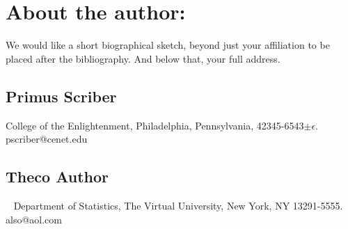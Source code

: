 \documentclass[a4paper]{article}
\begin{document}
\section*{About the author:}
   We would like a short biographical sketch,
   beyond just your affiliation to be placed
   after the bibliography.
   And below that, your full address.



\subsection*{Primus Scriber}
   College of the Enlightenment,
   Philadelphia, Pennsylvania, 42345-6543$\pm\epsilon$.
   pscriber@cenet.edu

\subsection*{Theco Author}~
   Department of Statistics,
   The Virtual University,
   New York, NY 13291-5555.
   also@aol.com
\end{document}
